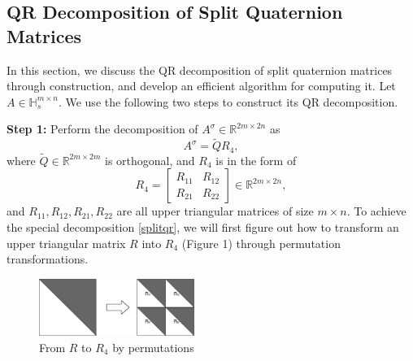 \documentclass{book}
\makeatletter
\def\my@tag@font{\normalsize}
\let\amsmath@eqref\eqref
\renewcommand\eqref[1]{{\let\my@tag@font\relax\amsmath@eqref{#1}}}
\theoremstyle{remark}
\makeatother
\begin{document}
\begin{multicols}{2}
\section{QR Decomposition of Split Quaternion Matrices}
In this section, we discuss the QR decomposition of split quaternion matrices through construction, and develop an efficient algorithm for computing it. Let $A \in \mathbb{H}_s^{m \times n}$. We use the following two steps to construct its QR decomposition.  

\textbf{Step 1:} Perform the decomposition of $A^\sigma \in \mathbb{R}^{2m \times 2n}$ as 
\begin{equation}\label{splitqr}
A^\sigma = \widetilde{Q} R_4,
\end{equation} 
where $\widetilde{Q} \in \mathbb{R}^{2m\times 2m}$ is orthogonal, and $R_4  $ is in the form of 
\begin{equation}\label{r4}
R_4 = \begin{bmatrix}
    R_{11} & R_{12} \\
    R_{21} & R_{22}
\end{bmatrix} \in \mathbb{R}^{2m \times 2n},
\end{equation}
and $R_{11}, R_{12},R_{21},R_{22}$ are all upper triangular matrices of size $m \times n$. To achieve the special decomposition \eqref{splitqr}, we will first  figure out how to  transform an upper triangular matrix $R$ into $R_4$ (Figure 1) through permutation transformations.
\begin{figure}[htbp]
        \centering
        \includegraphics[width=0.45\textwidth,keepaspectratio=true]{Figure_1.png} %
        \caption{From $R$ to $R_4$ by permutations }
        \label{fig:Figure_1}
\end{figure}


\end{multicols}
\end{document}
